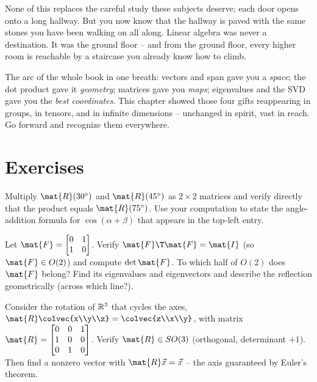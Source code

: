 None of this replaces the careful study these subjects deserve; each door opens onto
a long hallway. But you now know that the hallway is paved with the same stones you
have been walking on all along. Linear algebra was never a destination. It was the
ground floor -- and from the ground floor, every higher room is reachable by a
staircase you already know how to climb.

\begin{focusbox}
The arc of the whole book in one breath: vectors and span gave you a \emph{space};
the dot product gave it \emph{geometry}; matrices gave you \emph{maps}; eigenvalues
and the SVD gave you the \emph{best coordinates}. This chapter showed those four
gifts reappearing in groups, in tensors, and in infinite dimensions -- unchanged in
spirit, vast in reach. Go forward and recognize them everywhere.
\end{focusbox}

\section*{Exercises}

\begin{exercise}
\label{ch37:ex-so2}
Multiply $\mat{R}(30^\circ)$ and $\mat{R}(45^\circ)$ as $2\times 2$ matrices and
verify directly that the product equals $\mat{R}(75^\circ)$. Use your computation to
state the angle-addition formula for $\cos(\alpha+\beta)$ that appears in the
top-left entry.
\end{exercise}

\begin{exercise}
\label{ch37:ex-reflection}
Let $\mat{F}=\begin{bmatrix}0&1\\1&0\end{bmatrix}$. Verify $\mat{F}\T\mat{F}=\mat{I}$
(so $\mat{F}\in O(2)$) and compute $\det\mat{F}$. To which half of $O(2)$ does
$\mat{F}$ belong? Find its eigenvalues and eigenvectors and describe the reflection
geometrically (across which line?).
\end{exercise}

\begin{exercise}
\label{ch37:ex-euler}
Consider the rotation of $\mathbb{R}^3$ that cycles the axes, $\mat{R}\colvec{x\\y\\z}
=\colvec{z\\x\\y}$, with matrix
$\mat{R}=\begin{bmatrix}0&0&1\\1&0&0\\0&1&0\end{bmatrix}$. Verify $\mat{R}\in SO(3)$
(orthogonal, determinant $+1$). Then find a nonzero vector with $\mat{R}\vec{x}
=\vec{x}$ -- the axis guaranteed by Euler's theorem.
\end{exercise}

